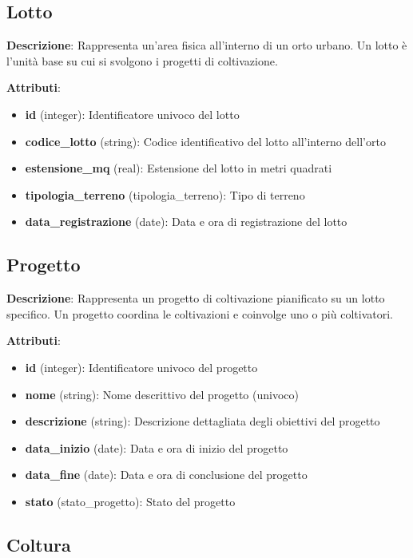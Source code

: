 \documentclass[12pt,a4paper]{article}
\begin{document}
\subsection{Lotto}

\textbf{Descrizione}: Rappresenta un'area fisica all'interno di un orto urbano. Un lotto è l'unità base su cui si svolgono i progetti di coltivazione.

\textbf{Attributi}:
\begin{itemize}[leftmargin=2.5cm]
    \item \textbf{id} (integer): Identificatore univoco del lotto
    \item \textbf{codice\_lotto} (string): Codice identificativo del lotto all'interno dell'orto
    \item \textbf{estensione\_mq} (real): Estensione del lotto in metri quadrati
    \item \textbf{tipologia\_terreno} (tipologia\_terreno): Tipo di terreno
    \item \textbf{data\_registrazione} (date): Data e ora di registrazione del lotto
\end{itemize}

\subsection{Progetto}

\textbf{Descrizione}: Rappresenta un progetto di coltivazione pianificato su un lotto specifico. Un progetto coordina le coltivazioni e coinvolge uno o più coltivatori.

\textbf{Attributi}:
\begin{itemize}[leftmargin=2.5cm]
    \item \textbf{id} (integer): Identificatore univoco del progetto
    \item \textbf{nome} (string): Nome descrittivo del progetto (univoco)
    \item \textbf{descrizione} (string): Descrizione dettagliata degli obiettivi del progetto
    \item \textbf{data\_inizio} (date): Data e ora di inizio del progetto
    \item \textbf{data\_fine} (date): Data e ora di conclusione del progetto
    \item \textbf{stato} (stato\_progetto): Stato del progetto
\end{itemize}

\subsection{Coltura}
\end{document}
